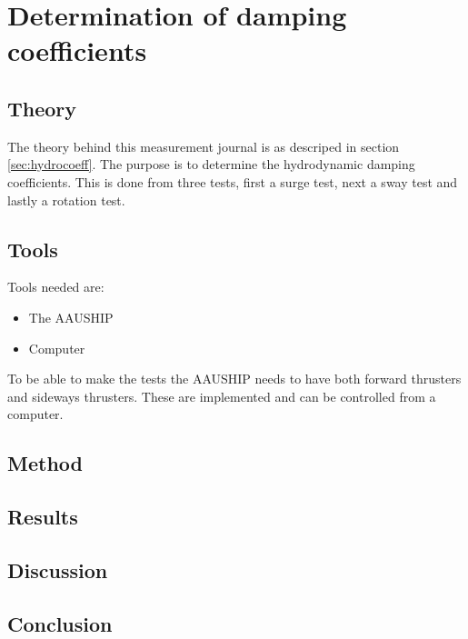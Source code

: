 \chapter{Determination of damping coefficients}
\label{app:damping}

\section{Theory}
The theory behind this measurement journal is as descriped in section \ref{sec:hydrocoeff}. The purpose is to determine the hydrodynamic damping coefficients. This is done from three tests, first a surge test, next a sway test and lastly a rotation test.

\section{Tools}
Tools needed are:
\begin{itemize}
	\item The AAUSHIP
	\item Computer
\end{itemize}
To be able to make the tests the AAUSHIP needs to have both forward thrusters and sideways thrusters. These are implemented and can be controlled from a computer.

\section{Method}

\section{Results}

\section{Discussion}

\section{Conclusion}
